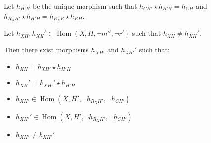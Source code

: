 \begin{lemma}
    \label{lem:2_distinct}





    Let \( h_{H'H} \) be the unique morphism such that \( h_{CH'} \star h_{H'H} = h_{CH} \) and \( h_{R_XH'} \star h_{H'H} = h_{R_XR} \star h_{RH} \). 

    Let \( h_{XH}, h_{XH}' \in \operatorname{Hom}(X, H, \lnot m'', \lnot r') \) such that \( h_{XH} \neq h_{XH}' \).
    
    Then there exist morphisms \( h_{XH'} \) and \( h_{XH'}' \) such that:
        \begin{itemize}
            \item \( h_{XH} = h_{XH'} \star h_{H'H} \)
            \item \( h_{XH}' = h_{XH'}' \star h_{H'H} \)
            \item \( h_{XH'} \in \operatorname{Hom}(X, H', \lnot h_{R_XH'}, \lnot h_{CH'}) \)
            \item \( h_{XH'}' \in \operatorname{Hom}(X, H', \lnot h_{R_XH'}, \lnot h_{CH'}) \)
            \item \( h_{XH'} \neq h_{XH'}' \)
        \end{itemize}    
\end{lemma}
  
